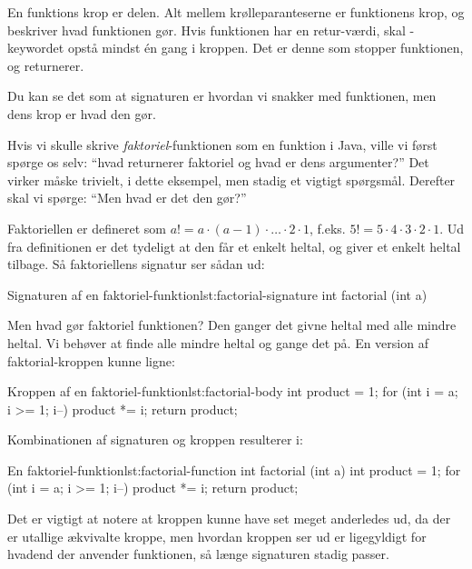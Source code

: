 	En funktions krop er  delen. Alt mellem
	krølleparanteserne er funktionens krop, og beskriver hvad funktionen gør.
	Hvis funktionen har en retur-værdi, skal -keywordet opstå
	mindst én gang i kroppen. Det er denne som stopper funktionen, og returnerer.

	Du kan se det som at signaturen er hvordan vi snakker med funktionen, men
	dens krop er hvad den gør.

	Hvis vi skulle skrive \emph{faktoriel}-funktionen som en funktion i Java,
	ville vi først spørge os selv: ``hvad returnerer faktoriel og hvad er dens
	argumenter?'' Det virker måske trivielt, i dette eksempel, men stadig et
	vigtigt spørgsmål. Derefter skal vi spørge: ``Men hvad er det den gør?''

	Faktoriellen er defineret som \(a! = a \cdot (a-1) \cdot \dots \cdot 2 \cdot 1\),
	f.eks. \(5! = 5 \cdot 4 \cdot 3 \cdot 2 \cdot 1\). Ud fra definitionen er det
	tydeligt at den får et enkelt heltal, og giver et enkelt heltal tilbage. Så
	faktoriellens signatur ser sådan ud:

	\begin{JavaCode}{Signaturen af en faktoriel-funktion}{lst:factorial-signature}
		int factorial (int a)
	\end{JavaCode}

	Men hvad gør faktoriel funktionen? Den ganger det givne heltal med alle mindre
	heltal. Vi behøver at finde alle mindre heltal og gange det på. En version
	af faktorial-kroppen kunne ligne:

	\begin{JavaCode}{Kroppen af en faktoriel-funktion}{lst:factorial-body}
		int product = 1;
		for (int i = a; i >= 1; i--)
			product *= i;
		return product;
	\end{JavaCode}

	Kombinationen af signaturen og kroppen resulterer i:

	\begin{JavaCode}{En faktoriel-funktion}{lst:factorial-function}
		int factorial (int a) {
			int product = 1;
			for (int i = a; i >= 1; i--)
				product *= i;
			return product;
		}
	\end{JavaCode}

	Det er vigtigt at notere at kroppen kunne have set meget anderledes ud, da
	der er utallige ækvivalte kroppe, men hvordan kroppen ser ud er ligegyldigt for
	hvadend der anvender funktionen, så længe signaturen stadig passer.


